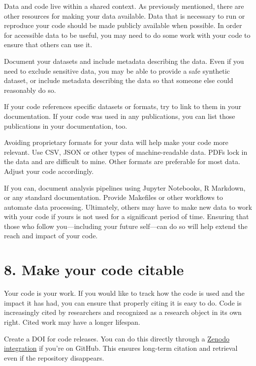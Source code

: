 \documentclass[10pt,letterpaper]{article}
\begin{document}
Data and code live within a shared context.
As previously mentioned, there are other resources for making your data available.
Data that is necessary to run or reproduce your code should be made publicly available when possible.
In order for accessible data to be useful,
you may need to do some work with your code to ensure that others can use it.

Document your datasets and include metadata describing the data.
Even if you need to exclude sensitive data,
you may be able to provide a safe synthetic dataset,
or include metadata describing the data so that someone else could reasonably do so.

If your code references specific datasets or formats,
try to link to them in your documentation.
If your code was used in any publications,
you can list those publications in your documentation, too.

Avoiding proprietary formats for your data will help make your code more relevant.
Use CSV, JSON or other types of machine-readable data.
PDFs lock in the data and are difficult to mine.
Other formats are preferable for most data.
Adjust your code accordingly.

If you can, document analysis pipelines using Jupyter Notebooks,
R Markdown,
or any standard documentation.
Provide Makefiles or other workflows to automate data processing.
Ultimately,
others may have to make new data to work with your code if yours is not used for a significant period of time.
Ensuring that those who follow you---including your future self---can do so
will help extend the reach and impact of your code.

\section*{8. Make your code citable}

Your code is your work.
If you would like to track how the code is used and the impact it has had,
you can ensure that properly citing it is easy to do.
Code is increasingly cited by researchers \cite{Smith2016,Katz2021,Garijo2024}
and recognized as a research object in its own right.
Cited work may have a longer lifespan.

Create a DOI for code releases.
You can do this directly through a
\href{https://docs.github.com/en/repositories/archiving-a-github-repository/referencing-and-citing-content}{Zenodo integration}
if you're on GitHub.
This ensures long-term citation and retrieval even if the repository disappears.
\end{document}
